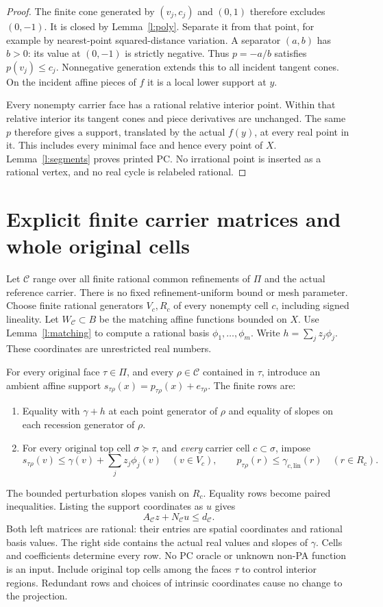 \documentclass[11pt]{article}
\begin{document}
\begin{proof}
The finite cone generated by $(v_j,c_j)$ and $(0,1)$ therefore excludes $(0,-1)$. It is closed by Lemma~\ref{l:poly}. Separate it from that point, for example by nearest-point squared-distance variation. A separator $(a,b)$ has $b>0$: its value at $(0,-1)$ is strictly negative. Thus $p=-a/b$ satisfies $p(v_j)\leq c_j$. Nonnegative generation extends this to all incident tangent cones. On the incident affine pieces of $f$ it is a local lower support at $y$.

Every nonempty carrier face has a rational relative interior point. Within that relative interior its tangent cones and piece derivatives are unchanged. The same $p$ therefore gives a support, translated by the actual $f(y)$, at every real point in it. This includes every minimal face and hence every point of $X$. Lemma~\ref{l:segments} proves printed PC. No irrational point is inserted as a rational vertex, and no real cycle is relabeled rational.
\end{proof}

\section{Explicit finite carrier matrices and whole original cells}\label{s:matrix}
Let $\mathcal C$ range over all finite rational common refinements of $\Pi$ and the actual reference carrier. There is no fixed refinement-uniform bound or mesh parameter. Choose finite rational generators $V_c,R_c$ of every nonempty cell $c$, including signed lineality. Let $W_\mathcal C\subset B$ be the matching affine functions bounded on $X$. Use Lemma~\ref{l:matching} to compute a rational basis $\phi_1,\ldots,\phi_m$. Write $h=\sum_j z_j\phi_j$. These coordinates are unrestricted real numbers.

For every original face $\tau\in\Pi$, and every $\rho\in\mathcal C$ contained in $\tau$, introduce an ambient affine support $s_{\tau\rho}(x)=p_{\tau\rho}(x)+e_{\tau\rho}$. The finite rows are:
\begin{enumerate}
\item Equality with $\gamma+h$ at each point generator of $\rho$ and equality of slopes on each recession generator of $\rho$.
\item For every original top cell $\sigma\succeq\tau$, and \emph{every} carrier cell $c\subset\sigma$, impose
\[
 s_{\tau\rho}(v)\leq\gamma(v)+\sum_j z_j\phi_j(v)\quad(v\in V_c),\qquad
 p_{\tau\rho}(r)\leq\gamma_{c,\mathrm{lin}}(r)\quad(r\in R_c).
                                                                    \tag{4.1}
\]
\end{enumerate}
The bounded perturbation slopes vanish on $R_c$. Equality rows become paired inequalities. Listing the support coordinates as $u$ gives
\[
 A_\mathcal C z+N_\mathcal C u\leq d_\mathcal C.                       \tag{4.2}
\]
Both left matrices are rational: their entries are spatial coordinates and rational basis values. The right side contains the actual real values and slopes of $\gamma$. Cells and coefficients determine every row. No PC oracle or unknown non-PA function is an input. Include original top cells among the faces $\tau$ to control interior regions. Redundant rows and choices of intrinsic coordinates cause no change to the projection.
\end{document}

